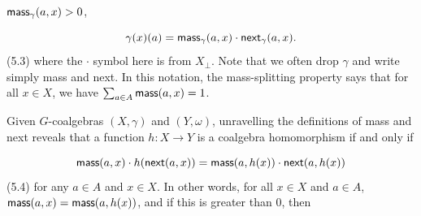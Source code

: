 \documentclass[11pt,a4paper]{amsart}
\begin{document}
\hypertarget{html:S5.SS0.SSS0.Px1.p5.m11}{}\({\mbox{\sf mass}_{\gamma}(a,x)>0}\),
\par\medskip
\hypertarget{html:S5.E3}{}   %
\hypertarget{html:S5.E3.m1}{}\[\gamma(x)(a)=\mbox{\sf mass}_{\gamma}(a,x)\cdot\mbox{\sf next}_{\gamma}(a,x).\]  (5.3)   where the %
\hypertarget{html:S5.SS0.SSS0.Px1.p5.m12}{}\({\cdot}\) symbol here is from %
\hypertarget{html:S5.SS0.SSS0.Px1.p5.m13}{}\({X_{\bot}}\). Note that we often drop %
\hypertarget{html:S5.SS0.SSS0.Px1.p5.m14}{}\({\gamma}\) and write simply mass and next. In this notation, the mass-splitting property says that for all %
\hypertarget{html:S5.SS0.SSS0.Px1.p5.m17}{}\({x\in X}\), we have %
\hypertarget{html:S5.SS0.SSS0.Px1.p5.m18}{}\({\sum_{a\in A}\mbox{\sf mass}(a,x)=1}\).
\par\medskip
\hypertarget{html:S5.SS0.SSS0.Px1.p6}{} Given %
\hypertarget{html:S5.SS0.SSS0.Px1.p6.m1}{}\({G}\)-coalgebras %
\hypertarget{html:S5.SS0.SSS0.Px1.p6.m2}{}\({(X,\gamma)}\) and %
\hypertarget{html:S5.SS0.SSS0.Px1.p6.m3}{}\({(Y,\omega)}\), unravelling the definitions of mass and next reveals that a function %
\hypertarget{html:S5.SS0.SSS0.Px1.p6.m6}{}\({h:X\to Y}\) is a coalgebra homomorphism if and only if
\par\medskip
\hypertarget{html:S5.E4}{}   %
\hypertarget{html:S5.E4.m1}{}\[\mbox{\sf mass}(a,x)\cdot h(\mbox{\sf next}(a,x))=\mbox{\sf mass}(a,h(x))\cdot\mbox{\sf next}(a,h(x))\]  (5.4)   for any %
\hypertarget{html:S5.SS0.SSS0.Px1.p6.m7}{}\({a\in A}\) and %
\hypertarget{html:S5.SS0.SSS0.Px1.p6.m8}{}\({x\in X}\). In other words, for all %
\hypertarget{html:S5.SS0.SSS0.Px1.p6.m9}{}\({x\in X}\) and %
\hypertarget{html:S5.SS0.SSS0.Px1.p6.m10}{}\({a\in A}\), %
\hypertarget{html:S5.SS0.SSS0.Px1.p6.m11}{}\({\mbox{\sf mass}(a,x)=\mbox{\sf mass}(a,h(x))}\), and if this is greater than %
\hypertarget{html:S5.SS0.SSS0.Px1.p6.m12}{}\({0}\), then %
\end{document}
